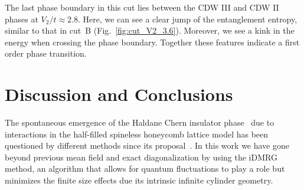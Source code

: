 \documentclass[aps,prx,10pt,twocolumn,floatfix,superscriptaddress,showpacs,numerical,footinbib]{revtex4-1}
\begin{document}
The last phase boundary in this cut lies between the CDW III and CDW II phases at $V_2/t \approx 2.8$.
%
Here, we can see a clear jump of the entanglement entropy, similar to that in cut~B (Fig.~\ref{fig:cut_V2_3.6}).
%
Moreover, we see a kink in the energy when crossing the phase boundary.
%
Together these features indicate a first order phase transition.



\section{\label{sec:discconc}Discussion and Conclusions}
%

The spontaneous emergence of the Haldane Chern insulator phase~\cite{H88} due to interactions in the half-filled spineless honeycomb lattice
model has been questioned by different methods since its proposal~\cite{RQHZ08,WF10,GCC13,GGNVC13,DH14,DCH14}.
%
In this work we have gone beyond previous mean field and exact diagonalization by using the iDMRG method, an algorithm that allows for quantum fluctuations
to play a role but minimizes the finite size effects due its intrinsic infinite cylinder geometry.
%
\end{document}
